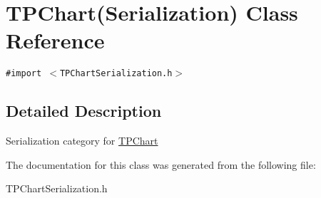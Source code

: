 \hypertarget{interface_t_p_chart_07_serialization_08}{
\section{TPChart(Serialization) Class Reference}
\label{interface_t_p_chart_07_serialization_08}
}
{\tt \#import $<$TPChartSerialization.h$>$}



\subsection{Detailed Description}
Serialization category for \hyperlink{interface_t_p_chart}{TPChart} 

The documentation for this class was generated from the following file:\begin{CompactItemize}
\item 
TPChartSerialization.h\end{CompactItemize}
